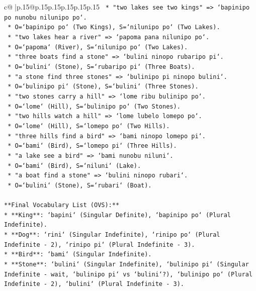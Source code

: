 \documentclass{article}
\begin{document}
{\begin{supertabular}{c@{$\;$}|p{.15\linewidth}@{}p{.15\linewidth}p{.15\linewidth}p{.15\linewidth}p{.15\linewidth}p{.15\linewidth}}
{{{\texttt{    *   "two lakes see two kings" => `bapinipo po nunobu nilunipo po`.} \\
\texttt{        *   O=`bapinipo po` (Two Kings), S=`nilunipo po` (Two Lakes).} \\
\texttt{    *   "two lakes hear a river" => `papoma pana nilunipo po`.} \\
\texttt{        *   O=`papoma` (River), S=`nilunipo po` (Two Lakes).} \\
\texttt{    *   "three boats find a stone" => `bulini ninopo rubaripo pi`.} \\
\texttt{        *   O=`bulini` (Stone), S=`rubaripo pi` (Three Boats).} \\
\texttt{    *   "a stone find three stones" => `bulinipo pi ninopo bulini`.} \\
\texttt{        *   O=`bulinipo pi` (Stone), S=`bulini` (Three Stones).} \\
\texttt{    *   "two stones carry a hill" => `lome ribu bulinipo po`.} \\
\texttt{        *   O=`lome` (Hill), S=`bulinipo po` (Two Stones).} \\
\texttt{    *   "two hills watch a hill" => `lome lubelo lomepo po`.} \\
\texttt{        *   O=`lome` (Hill), S=`lomepo po` (Two Hills).} \\
\texttt{    *   "three hills find a bird" => `bami ninopo lomepo pi`.} \\
\texttt{        *   O=`bami` (Bird), S=`lomepo pi` (Three Hills).} \\
\texttt{    *   "a lake see a bird" => `bami nunobu niluni`.} \\
\texttt{        *   O=`bami` (Bird), S=`niluni` (Lake).} \\
\texttt{    *   "a boat find a stone" => `bulini ninopo rubari`.} \\
\texttt{        *   O=`bulini` (Stone), S=`rubari` (Boat).} \\
\\ 
\texttt{**Final Vocabulary List (OVS):**} \\
\texttt{*   **King**: `bapini` (Singular Definite), `bapinipo po` (Plural Indefinite).} \\
\texttt{*   **Dog**: `rini` (Singular Indefinite), `rinipo po` (Plural Indefinite {-} 2), `rinipo pi` (Plural Indefinite {-} 3).} \\
\texttt{*   **Bird**: `bami` (Singular Indefinite).} \\
\texttt{*   **Stone**: `bulini` (Singular Indefinite), `bulinipo pi` (Singular Indefinite {-} wait, `bulinipo pi` vs `bulini`?), `bulinipo po` (Plural Indefinite {-} 2), `bulini` (Plural Indefinite {-} 3).} \\
}}}
\end{supertabular}}
\end{document}

